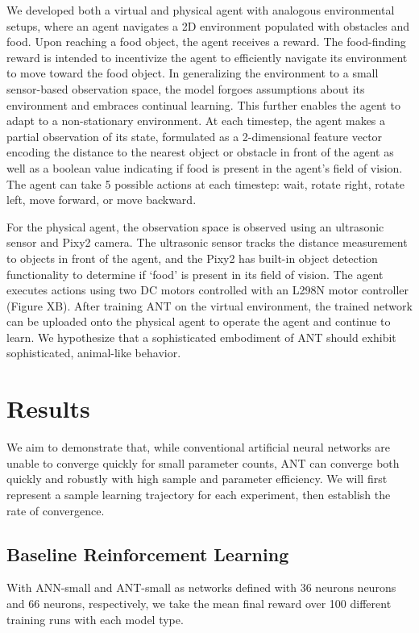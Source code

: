 \documentclass{article}
\begin{document}
\begin{multicols}{2}
	We developed both a virtual and physical agent with analogous environmental setups, where an agent navigates a 2D environment populated with obstacles and food. Upon reaching a food object, the agent receives a reward. The food-finding reward is intended to incentivize the agent to efficiently navigate its environment to move toward the food object. In generalizing the environment to a small sensor-based observation space, the model forgoes assumptions about its environment and embraces continual learning. This further enables the agent to adapt to a non-stationary environment. At each timestep, the agent makes a partial observation of its state, formulated as a 2-dimensional feature vector encoding the distance to the nearest object or obstacle in front of the agent as well as a boolean value indicating if food is present in the agent’s field of vision. The agent can take 5 possible actions at each timestep: wait, rotate right, rotate left, move forward, or move backward.

	For the physical agent, the observation space is observed using an ultrasonic sensor and Pixy2 camera. The ultrasonic sensor tracks the distance measurement to objects in front of the agent, and the Pixy2 has built-in object detection functionality to determine if ‘food’ is present in its field of vision. The agent executes actions using two DC motors controlled with an L298N motor controller (Figure XB). After training ANT on the virtual environment, the trained network can be uploaded onto the physical agent to operate the agent and continue to learn. We hypothesize that a sophisticated embodiment of ANT should exhibit sophisticated, animal-like behavior.
	
	\section{Results}
	
	We aim to demonstrate that, while conventional artificial neural networks are unable to converge quickly for small parameter counts, ANT can converge both quickly and robustly with high sample and parameter efficiency. We will first represent a sample learning trajectory for each experiment, then establish the rate of convergence.
	
	\subsection{Baseline Reinforcement Learning}
	
	With ANN-small and ANT-small as networks defined with 36 neurons neurons and 66 neurons, respectively, we take the mean final reward over 100 different training runs with each model type.
	

\end{multicols}
\end{document}
